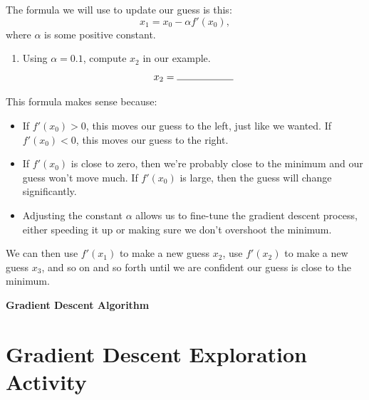 \documentclass[11pt]{article}
\begin{document}
The formula we will use to update our guess is this:
\[
    x_1 = x_0 - \alpha f'(x_0),
\]
where $\alpha$ is some positive constant.
\begin{enumerate}
    \item[2.]  Using $\alpha = 0.1$, compute $x_2$ in our example.
    \[
        x_2 = \rule{2cm}{0.4pt}
    \]
\end{enumerate}
This formula makes sense because:
\begin{itemize}
    \item If $f'(x_0)>0$, this moves our guess to the left, just like we wanted. If $f'(x_0) < 0$, this moves our guess to the right.
    \item If $f'(x_0)$ is close to zero, then we're probably close to the minimum and our guess won't move much. If $f'(x_0)$ is large, then the guess will change significantly.
    \item Adjusting the constant $\alpha$ allows us to fine-tune the gradient descent process, either speeding it up or making sure we don't overshoot the minimum.
\end{itemize}
We can then use $f'(x_1)$ to make a new guess $x_2$, use $f'(x_2)$ to make a new guess $x_3$, and so on and so forth until we are confident our guess is close to the minimum.

\newpage
{\bf Gradient Descent Algorithm}\\


\newpage
\section*{Gradient Descent Exploration Activity}
\end{document}
